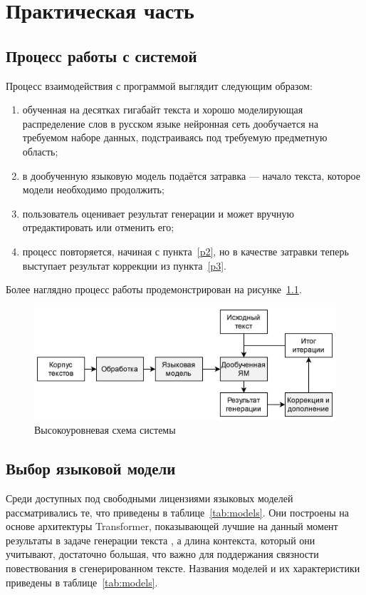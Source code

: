 \chapter{Практическая часть}

\section{Процесс работы с системой}

Процесс взаимодействия с программой выглядит следующим образом:
\begin{enumerate}
    \item обученная на десятках гигабайт текста и хорошо моделирующая распределение слов в русском языке нейронная сеть дообучается на требуемом наборе данных, подстраиваясь под требуемую предметную область;
    \item \label{p2} в дообученную языковую модель подаётся затравка --- начало текста, которое модели необходимо продолжить;
    \item \label{p3} пользователь оценивает результат генерации и может вручную отредактировать или отменить его;
    \item процесс повторяется, начиная с пункта \ref*{p2}, но в качестве затравки теперь выступает результат коррекции из пункта \ref*{p3}.
\end{enumerate}

Более наглядно процесс работы продемонстрирован на рисунке \ref*{fig:pipeline}.

\begin{figure}[h]
    \centering
    \includegraphics[width=\textwidth]{../inc/images/pipeline.png}
    \caption{Высокоуровневая схема системы}
    \label{fig:pipeline}
\end{figure}

\section{Выбор языковой модели}

Среди доступных под свободными лицензиями языковых моделей рассматривались те, что приведены в таблице \ref*{tab:models}. Они построены на основе архитектуры Transformer, показывающей лучшие на данный момент результаты в задаче генерации текста \cite{art:models_review}, а длина контекста, который они учитывают, достаточно большая, что важно для поддержания связности повествования в сгенерированном тексте. Названия моделей и их характеристики приведены в таблице \ref*{tab:models}.


